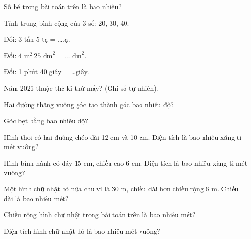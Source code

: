 \begin{ex}
Số bé trong bài toán trên là bao nhiêu?
\end{ex}

\begin{ex}
Tính trung bình cộng của 3 số: 20, 30, 40.
\end{ex}

\begin{ex}
Đổi: 3 tấn 5 tạ = \dots tạ.
\end{ex}

\begin{ex}
Đổi: $4\text{ m}^2\ 25\text{ dm}^2 = \dots\text{ dm}^2$.
\end{ex}

\begin{ex}
Đổi: 1 phút 40 giây = \dots giây.
\end{ex}

\begin{ex}
Năm 2026 thuộc thế kỉ thứ mấy? (Ghi số tự nhiên).
\end{ex}

\begin{ex}
Hai đường thẳng vuông góc tạo thành góc bao nhiêu độ?
\end{ex}

\begin{ex}
Góc bẹt bằng bao nhiêu độ?
\end{ex}

\begin{ex}
Hình thoi có hai đường chéo dài 12 cm và 10 cm. Diện tích là bao nhiêu xăng-ti-mét vuông?
\end{ex}

\begin{ex}
Hình bình hành có đáy 15 cm, chiều cao 6 cm. Diện tích là bao nhiêu xăng-ti-mét vuông?
\end{ex}

\begin{ex}
Một hình chữ nhật có nửa chu vi là 30 m, chiều dài hơn chiều rộng 6 m. Chiều dài là bao nhiêu mét?
\end{ex}

\begin{ex}
Chiều rộng hình chữ nhật trong bài toán trên là bao nhiêu mét?
\end{ex}

\begin{ex}
Diện tích hình chữ nhật đó là bao nhiêu mét vuông?
\end{ex}
